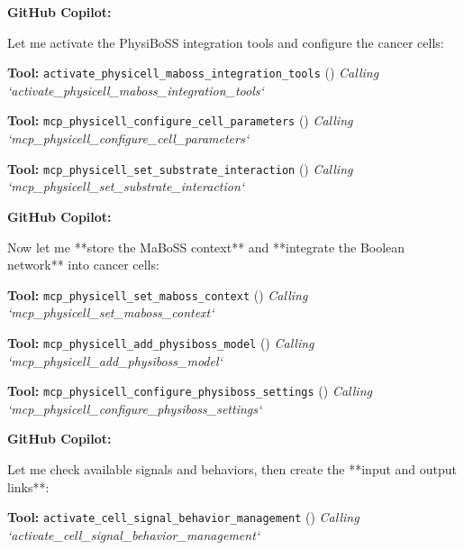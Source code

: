\documentclass[11pt,a4paper]{article}
\begin{document}
\begin{copilotbox}
\textbf{GitHub Copilot:}

Let me activate the PhysiBoSS integration tools and configure the cancer cells:

\end{copilotbox}
\begin{toolokbox}
\textbf{Tool:} \texttt{activate\_physicell\_maboss\_integration\_tools} (\checkmark)
\textit{Calling `activate\_physicell\_maboss\_integration\_tools`}
\end{toolokbox}
\begin{toolokbox}
\textbf{Tool:} \texttt{mcp\_physicell\_configure\_cell\_parameters} (\checkmark)
\textit{Calling `mcp\_physicell\_configure\_cell\_parameters`}
\end{toolokbox}
\begin{toolokbox}
\textbf{Tool:} \texttt{mcp\_physicell\_set\_substrate\_interaction} (\checkmark)
\textit{Calling `mcp\_physicell\_set\_substrate\_interaction`}
\end{toolokbox}
\begin{copilotbox}
\textbf{GitHub Copilot:}

Now let me **store the MaBoSS context** and **integrate the Boolean network** into cancer cells:

\end{copilotbox}
\begin{toolokbox}
\textbf{Tool:} \texttt{mcp\_physicell\_set\_maboss\_context} (\checkmark)
\textit{Calling `mcp\_physicell\_set\_maboss\_context`}
\end{toolokbox}
\begin{toolokbox}
\textbf{Tool:} \texttt{mcp\_physicell\_add\_physiboss\_model} (\checkmark)
\textit{Calling `mcp\_physicell\_add\_physiboss\_model`}
\end{toolokbox}
\begin{toolokbox}
\textbf{Tool:} \texttt{mcp\_physicell\_configure\_physiboss\_settings} (\checkmark)
\textit{Calling `mcp\_physicell\_configure\_physiboss\_settings`}
\end{toolokbox}
\begin{copilotbox}
\textbf{GitHub Copilot:}

Let me check available signals and behaviors, then create the **input and output links**:

\end{copilotbox}
\begin{toolokbox}
\textbf{Tool:} \texttt{activate\_cell\_signal\_behavior\_management} (\checkmark)
\textit{Calling `activate\_cell\_signal\_behavior\_management`}
\end{toolokbox}
\end{document}
